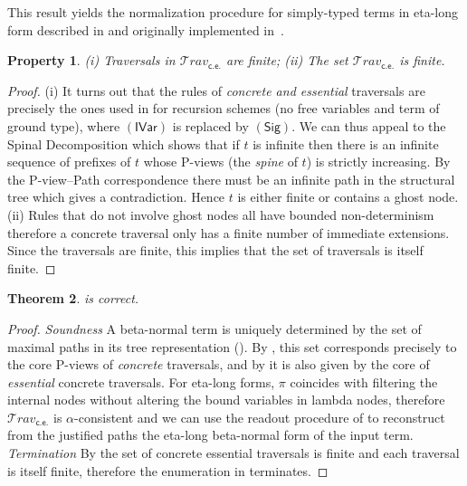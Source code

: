 \documentclass[xchauthor,chkrefs,GCNS,amsmath,amsthm,rotating,leaveRGB]{tcsg}
\theoremstyle{plain}
\newtheorem{theorem}{Theorem}[section]
\newtheorem{property}[theorem]{Property}
\theoremstyle{definition}
\newcommand\travset{\mathcal{T}\!rav}
\newcommand{\concreteessential}{\mathsf{c.e.}}
\newcommand{\travsetcones}{\travset_{\concreteessential}}
\def\coresymbol{\pi}
\begin{document}
This result yields the normalization procedure for simply-typed terms in
eta-long form described in
 and
originally implemented in~\cite{BlumGalop2008,Blum-HogTool}.\eject



\begin{property}\label{prop:concrete_essential_trav_finite}
\textit{(i)} Traversals in $\travsetcones $ are finite;
\textit{(ii)} The set $\travsetcones $ is finite.
\end{property}

\begin{proof}
(i) It turns out that the rules of \emph{concrete and essential} traversals
are precisely the ones used in \cite{OngLics2006} for recursion schemes (no
free variables and term of ground type), where $\mathsf{(IVar)}$ is replaced
by $\mathsf{(Sig)}$. We can thus appeal to the Spinal Decomposition
\cite[Lemma 8]{OngLics2006} which shows that if $t$ is infinite then there is
an infinite sequence of prefixes of $t$ whose P-views (the \emph{spine} of
$t$) is strictly increasing. By the P-view--Path correspondence there must be
an infinite path in the structural tree which gives a contradiction. Hence
$t$ is either finite or contains a ghost node. (ii) Rules that do not involve
ghost nodes all have bounded non-determinism therefore a concrete traversal
only has a finite number of immediate extensions. Since the traversals are
finite, this implies that the set of traversals is itself finite.
\end{proof}

\begin{theorem}
 is correct.
\end{theorem}

\begin{proof}
\emph{Soundness} A beta-normal term is uniquely determined by the set of
maximal paths in its tree representation
(). By
, this set corresponds
precisely to the core P-views of \emph{concrete} traversals, and by
 it is also
given by the core of \emph{essential} concrete traversals. For eta-long
forms, $\coresymbol $ coincides with filtering the internal nodes without
altering the bound variables in lambda nodes, therefore $\travsetcones $ is
$\alpha $-consistent and we can use the readout procedure of
to reconstruct from the justified paths the eta-long beta-normal form of the
input term. \emph{Termination} By
 the set of
concrete essential traversals is finite and each traversal is itself finite,
therefore the enumeration in
 terminates.
\end{proof}
\end{document}
